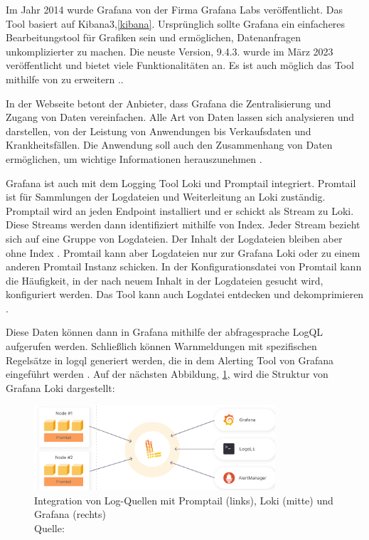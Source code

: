 Im Jahr 2014 wurde Grafana von der Firma Grafana Labs veröffentlicht. Das Tool basiert auf Kibana3,\ref{kibana}. Ursprünglich sollte Grafana ein einfacheres Bearbeitungstool für Grafiken sein und ermöglichen, Datenanfragen unkomplizierter zu machen. Die neuste Version, 9.4.3. wurde im März 2023 veröffentlicht und bietet viele Funktionalitäten an. Es ist auch möglich das Tool mithilfe von   zu erweitern \citep{Oedegaard_historyGrafana}.. 

In der Webseite betont der Anbieter, dass Grafana die Zentralisierung und Zugang von Daten vereinfachen. Alle Art von Daten lassen sich analysieren und darstellen, von der Leistung von Anwendungen bis Verkaufsdaten und Krankheitsfällen. Die Anwendung soll auch den Zusammenhang von Daten ermöglichen, um wichtige Informationen herauszunehmen \citep{Grafana_Grafana}.

Grafana ist auch mit dem Logging Tool Loki und Promptail integriert. Promtail ist für Sammlungen der Logdateien und Weiterleitung an Loki zuständig. Promptail wird an jeden \gls{Endpoint} installiert und er schickt als Stream zu Loki. Diese Streams werden dann identifiziert mithilfe von Index. Jeder Stream bezieht sich auf eine Gruppe von Logdateien. Der Inhalt der Logdateien bleiben aber ohne Index \citep{Grafana_fundamentals}. Promtail kann aber Logdateien nur zur Grafana Loki oder zu einem anderen Promtail Instanz schicken. In der Konfigurationsdatei von Promtail kann die Häufigkeit, in der nach neuem Inhalt in der Logdateien gesucht wird, konfiguriert werden. Das Tool kann auch Logdatei entdecken und dekomprimieren \citep{Grafana_Promtail}. 

Diese Daten können dann in Grafana mithilfe der \gls{abfragesprache} LogQL aufgerufen werden. Schließlich können Warnmeldungen mit spezifischen Regelsätze in \gls{logql} generiert werden, die in dem Alerting Tool von Grafana eingeführt werden \citep{Grafana_loki}. Auf der nächsten Abbildung, \ref{fig:Integration_Loki_Promtail_Grafana}, wird die Struktur von Grafana Loki  dargestellt:

\begin{figure}[H]
   \centering
   \includegraphics[width=0.8\textwidth]{assets/2_p10.png}
   \caption[Integration von Log-Quellen mit Promptail, Loki und Grafana]
   {Integration von Log-Quellen mit Promptail (links), Loki (mitte) und Grafana (rechts) \\Quelle: \citep{Grafana_Logs}}
   \label{fig:Integration_Loki_Promtail_Grafana}
   \centering
\end{figure}

